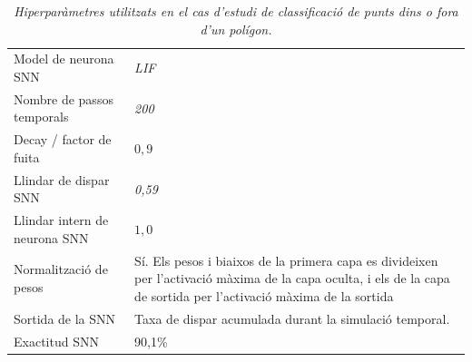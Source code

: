 \documentclass[a4paper,11pt, titlepage, twoside]{article}
\begin{document}
\begin{appendices}
\begin{table}[H]
\begin{tabular}{p{4.2cm} p{8.5cm}}
			Model de neurona SNN
			                   & \textit{LIF}                                                                                                                                                        \\

			Nombre de passos temporals
			                   & \textit{200}                                                                                                                                                        \\

			Decay / factor de fuita
			                   & $0,9$                                                                                                                                                               \\

			Llindar de dispar SNN
			                   & \textit{0,59}                                                                                                                                                       \\

			Llindar intern de neurona SNN
			                   & $1,0$                                                                                                                                                               \\

			Normalització de pesos
			                   & Sí. Els pesos i biaixos de la primera capa es divideixen per l'activació màxima de la capa oculta, i els de la capa de sortida per l'activació màxima de la sortida \\

			Sortida de la SNN
			                   & Taxa de dispar acumulada durant la simulació temporal.                                                                                                              \\

			Exactitud SNN
			                   & 90,1\%                                                                                                                                                              \\

			\hline
		\end{tabular}

		\caption*{\textit{Hiperparàmetres utilitzats en el cas d'estudi de classificació de punts dins o fora d'un polígon.}}
		\label{tab:hiperparametres_poligon}
	\end{table}


\end{appendices}
\end{document}
